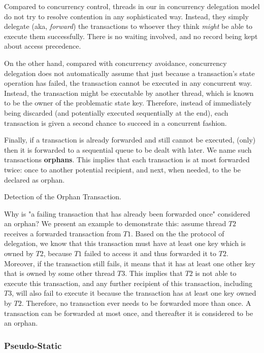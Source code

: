 Compared to concurrency control, threads in our in concurrency delegation model do not try to
resolve contention in any sophisticated way. Instead, they simply delegate (aka, \textit{forward})
the transactions to whoever they think \textit{might} be able to execute them successfully. There is
no waiting involved, and no record being kept about access precedence.

On the other hand, compared with concurrency avoidance, concurrency delegation does not
automatically assume that just because a transaction's state operation has failed, the transaction
cannot be executed in any concurrent way. Instead, the transaction might be executable by another
thread, which is known to be the owner of the problematic state key. Therefore, instead of immediately
being discarded (and potentially executed sequentially at the end), each transaction is given a
second chance to succeed in a concurrent fashion.

Finally, if a transaction is already forwarded and still cannot be executed, (only) then it is
forwarded to a sequential queue to be dealt with later. We name such transactions \textbf{orphans}.
This implies that each transaction is at most forwarded twice: once to another potential recipient,
and next, when needed, to the be declared as orphan.

\begin{lemma}
	Detection of the Orphan Transaction.

	Why is "a failing transaction that has already been forwarded once" considered an orphan? We
	present an example to demonstrate this: assume thread $T2$ receives a forwarded transaction from
	$T1$. Based on the the protocol of delegation, we know that this transaction must have at least
	one key which is owned by $T2$, because $T1$ failed to access it and thus forwarded it to $T2$.
	Moreover, if the transaction still fails, it means that it has at least one other key that is
	owned by some other thread $T3$. This implies that $T2$ is not able to execute this
	transaction, and any further recipient of this transaction, including $T3$, will also fail to
	execute it because the transaction has at least one key owned by $T2$. Therefore, no transaction
	ever needs to be forwarded more than once. A transaction can be forwarded at most once, and
	thereafter it is considered to be an orphan.
\end{lemma}

\subsubsection{Pseudo-Static}

